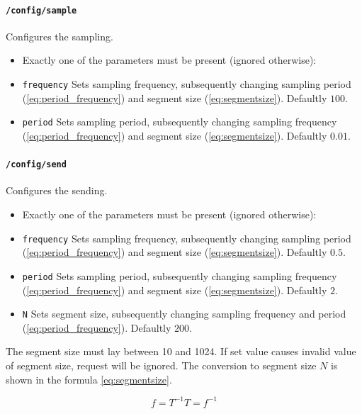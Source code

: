 \paragraph{\texttt{/config/sample}}
Configures the sampling.
\begin{itemize}
    \item[] Exactly one of the parameters must be present (ignored otherwise):
    \item[] \texttt{frequency} Sets sampling frequency, subsequently changing sampling period (\ref{eq:period_frequency}) and segment size (\ref{eq:segmentsize}). Defaultly $100$.
    \item[] \texttt{period}    Sets sampling period, subsequently changing sampling frequency (\ref{eq:period_frequency}) and segment size (\ref{eq:segmentsize}). Defaultly $0.01$.
\end{itemize}

\paragraph{\texttt{/config/send}}
Configures the sending.
\begin{itemize}
    \item[] Exactly one of the parameters must be present (ignored otherwise):
    \item[] \texttt{frequency} Sets sampling frequency, subsequently changing sampling period (\ref{eq:period_frequency}) and segment size (\ref{eq:segmentsize}). Defaultly $0.5$.
    \item[] \texttt{period}    Sets sampling period, subsequently changing sampling frequency (\ref{eq:period_frequency}) and segment size (\ref{eq:segmentsize}). Defaultly $2$.
    \item[] \texttt{N}         Sets segment size, subsequently changing sampling frequency and period (\ref{eq:period_frequency}). Defaultly $200$.
\end{itemize}

The segment size must lay between 10 and 1024. If set value causes invalid value of segment size,
request will be ignored. The conversion to segment size $N$ is shown in the formula \ref{eq:segmentsize}.

\begin{subequations}
\begin{equation}
f = T^{-1}
\end{equation}
\begin{equation}
T = f^{-1}
\end{equation}
\label{eq:period_frequency}
\end{subequations}

